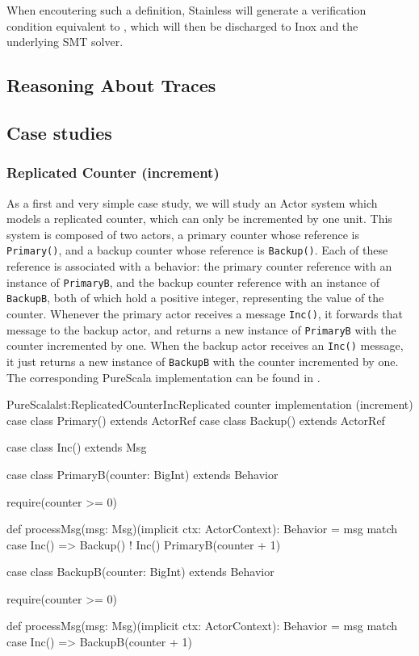 When encoutering such a definition, Stainless will generate a verification condition 
equivalent to , which will then be discharged to Inox and the underlying SMT solver.

\subsection{Reasoning About Traces}
\label{traces}


\subsection{Case studies}
\label{casestudies}

\subsubsection*{Replicated Counter (increment)}

As a first and very simple case study, we will study an Actor system which models a
replicated counter, which can only be incremented by one unit. This system is 
composed of two actors, a primary counter whose reference is \texttt{Primary()},
and a backup counter whose reference is \texttt{Backup()}.
Each of these reference is associated with a behavior: the primary counter reference with
an instance of \texttt{PrimaryB}, and the backup counter reference with an instance 
of \texttt{BackupB}, both of which hold a positive integer, representing the value of the
counter. Whenever the primary actor receives a message \texttt{Inc()}, it forwards that
message to the backup actor, and returns a new instance of \texttt{PrimaryB} with the
counter incremented by one. When the backup actor receives an \texttt{Inc()} message,
it just returns a new instance of \texttt{BackupB} with the counter incremented by one. 
The corresponding PureScala implementation can be found
in .

\begin{Code}{PureScala}{lst:ReplicatedCounterInc}{Replicated counter implementation (increment)}
case class Primary() extends ActorRef
case class Backup()  extends ActorRef

case class Inc() extends Msg

case class PrimaryB(counter: BigInt) extends Behavior {
  require(counter >= 0)

  def processMsg(msg: Msg)(implicit ctx: ActorContext): Behavior = msg match {
    case Inc() =>
      Backup() ! Inc()
      PrimaryB(counter + 1)
  }
}

case class BackupB(counter: BigInt) extends Behavior {
  require(counter >= 0)

  def processMsg(msg: Msg)(implicit ctx: ActorContext): Behavior = msg match {
    case Inc() => BackupB(counter + 1)
  }
}
\end{Code}

